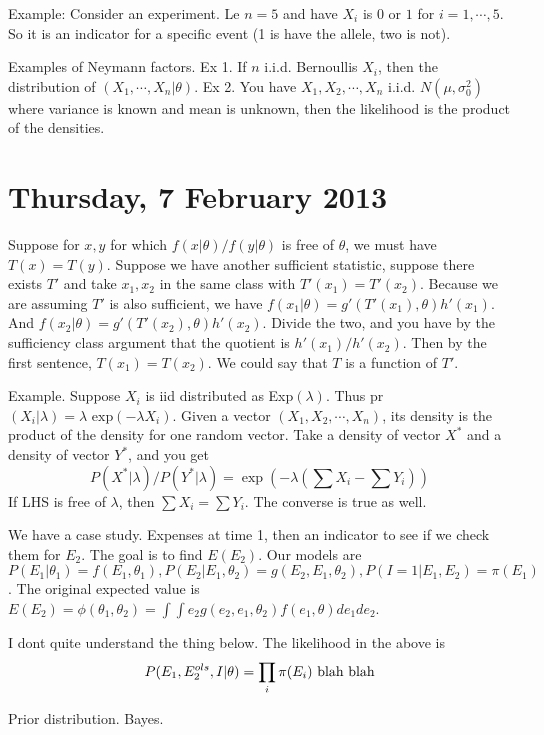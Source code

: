 \documentclass[letterpaper, 12pt]{article}
\theoremstyle{definition}
\theoremstyle{plain}
\begin{document}
Example: Consider an experiment. Le $n = 5$ and have $X_i$ is $0$ or $1$ for $i = 1, \cdots, 5$. So it is an indicator for a specific event (1 is have the allele, two is not).

Examples of Neymann factors. Ex 1. If $n$ i.i.d. Bernoullis $X_i$, then the distribution of $(X_1, \cdots, X_n | \theta)$. Ex 2. You have $X_1, X_2, \cdots, X_n$ i.i.d. $N(\mu, \sigma^2_0)$ where variance is known and mean is unknown, then the likelihood is the product of the densities.

\section{Thursday, 7 February 2013}
Suppose for $x,y$ for which $f(x|\theta) / f(y | \theta)$ is free of $\theta$, we must have $T(x) = T(y)$. 
Suppose we have another sufficient statistic, suppose there exists $T'$ and take $x_1, x_2$ in the same class with $T'(x_1) = T'(x_2)$. 
Because we are assuming $T'$ is also sufficient, we have $f(x_1 | \theta) = g'(T'(x_1), \theta) h'(x_1)$. And $f(x_2 | \theta) = g'(T'(x_2), \theta) h'(x_2)$. 
Divide the two, and you have by the sufficiency class argument that the quotient is $h'(x_1) / h'(x_2)$. 
Then by the first sentence, $T(x_1) = T(x_2)$.
We could say that $T$ is a function of $T'$.

Example. Suppose $X_i$ is iid distributed as Exp$(\lambda)$. Thus pr$(X_i | \lambda) = \lambda \text{ exp}(-\lambda X_i)$.
Given a vector $(X_1, X_2, \cdots, X_n)$, its density is the product of the density for one random vector. Take a density of vector $X^*$ and a density of vector $Y^*$, and you get 
\[
P(X^* | \lambda) / P(Y^* | \lambda) = \exp(-\lambda(\sum X_i - \sum Y_i))
\]
If LHS is free of $\lambda$, then $\sum X_i = \sum Y_i$. The converse is true as well.

We have a case study. Expenses at time 1, then an indicator to see if we check them for $E_2$. The goal is to find $E(E_2)$. Our models are $P(E_1 | \theta_1) = f(E_1, \theta_1), P(E_2 | E_1, \theta_2) = g(E_2, E_1, \theta_2), P(I = 1| E_1, E_2) = \pi (E_1)$. The original expected value is $E(E_2) = \phi(\theta_1, \theta_2) = \int \int e_2 g(e_2, e_1, \theta_2) f(e_1, \theta) d e_1 d e_2$.


I dont quite understand the thing below.
The likelihood in the above is 
$$
P(E_1, E_2^{ols}, I | \theta) \\
=\prod_i \pi (E_i) \text{ blah blah} 
$$

Prior distribution. Bayes.
\end{document}
